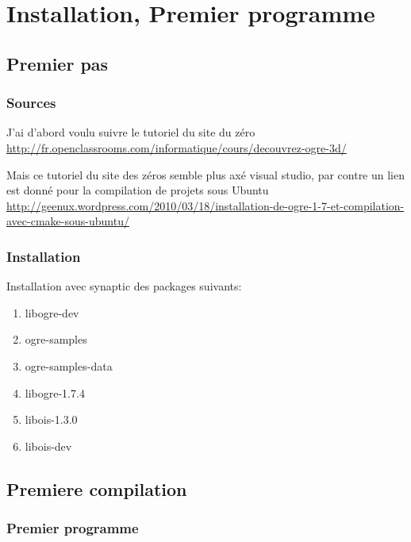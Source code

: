 
\chapter{Installation, Premier programme}


\section{Premier pas}
\subsection{Sources}
J'ai d'abord voulu suivre le tutoriel du site du z\'ero
\url{http://fr.openclassrooms.com/informatique/cours/decouvrez-ogre-3d/}\newline

Mais ce tutoriel du site des zéros semble plus axé visual studio, par contre un lien est donné pour la compilation de projets sous Ubuntu \url{http://geenux.wordpress.com/2010/03/18/installation-de-ogre-1-7-et-compilation-avec-cmake-sous-ubuntu/}


\subsection{Installation}
Installation avec synaptic des packages suivants:
\begin{enumerate}
\item libogre-dev
\item ogre-samples
\item ogre-samples-data
\item libogre-1.7.4
\item libois-1.3.0
\item libois-dev 
\end{enumerate}






\section{Premiere compilation}

\subsection{Premier programme}


